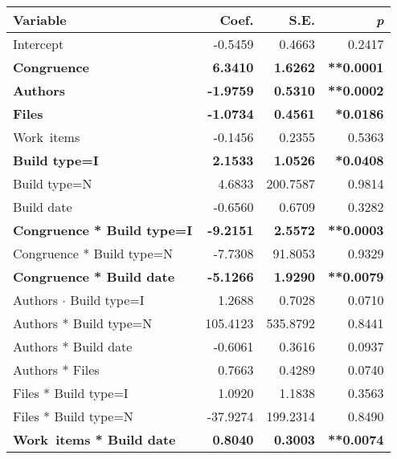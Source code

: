 \begin{table}[t]
\begin{center}
\begin{tabular}{l@{\hspace{0pt}}r@{\hspace{10pt}}r@{\hspace{5pt}}r}
\toprule
Variable & Coef. & S.E. & \emph{p} \\
	\midrule
Intercept                   &  -0.5459 &   0.4663 & 0.2417 \\
\textbf{Congruence}              &   \textbf{6.3410} &   \textbf{1.6262} & \textbf{**0.0001} \\
\textbf{Authors}                     &  \textbf{-1.9759} &   \textbf{0.5310} & \textbf{**0.0002}  \\
\textbf{Files}                       &  \textbf{-1.0734} &   \textbf{0.4561} & \textbf{*0.0186}  \\
Work~items                   &  -0.1456 &   0.2355 & 0.5363  \\
\textbf{Build type=I}                      &   \textbf{2.1533} &   \textbf{1.0526} & \textbf{*0.0408}  \\
Build type=N                      &   4.6833 & 200.7587 & 0.9814  \\
Build date                   &  -0.6560 &   0.6709 & 0.3282  \\
\textbf{Congruence * Build type=I}     &  \textbf{-9.2151} &   \textbf{2.5572} & \textbf{**0.0003}  \\
Congruence * Build type=N     &  -7.7308 &  91.8053 & 0.9329  \\
\textbf{Congruence * Build date}  &  \textbf{-5.1266} &   \textbf{1.9290} & \textbf{**0.0079}  \\
Authors $\cdot$ Build type=I            &   1.2688 &   0.7028 & 0.0710  \\
Authors * Build type=N            & 105.4123 & 535.8792 & 0.8441  \\
Authors * Build date         &  -0.6061 &   0.3616 & 0.0937 \\
Authors * Files             &   0.7663 &   0.4289 & 0.0740  \\
Files * Build type=I              &   1.0920 &   1.1838 & 0.3563  \\
Files * Build type=N              & -37.9274 & 199.2314 & 0.8490  \\
\textbf{Work~items * Build date}       &   \textbf{0.8040} &   \textbf{0.3003} & \textbf{**0.0074}  \\

\end{tabular}
\end{center}
\end{table}
